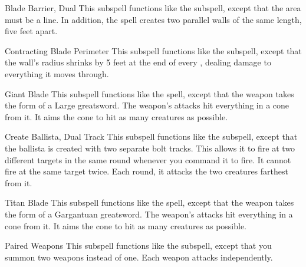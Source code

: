 \begin{ability}[\nth{3}]{Blade Barrier, Dual}
This subspell functions like the  subspell, except that the area must be a line.
In addition, the spell creates two parallel walls of the same length, five feet apart.
\end{ability}
\vspace{0.25em}


\begin{ability}[\nth{3}]{Contracting Blade Perimeter}
This subspell functions like the  subspell, except that the wall's radius shrinks by 5 feet at the end of every , dealing damage to everything it moves through.
\end{ability}
\vspace{0.25em}


\begin{ability}[\nth{3}]{Giant Blade}
This subspell functions like the  spell, except that the weapon takes the form of a Large greatsword.
The weapon's attacks hit everything in a \areasmall cone from it.
It aims the cone to hit as many creatures as possible.
\end{ability}
\vspace{0.25em}


\begin{ability}[\nth{4}]{Create Ballista, Dual Track}
This subspell functions like the  subspell, except that the ballista is created with two separate bolt tracks.
This allows it to fire at two different targets in the same round whenever you command it to fire.
It cannot fire at the same target twice.
Each round, it attacks the two creatures farthest from it.
\end{ability}
\vspace{0.25em}


\begin{ability}[\nth{6}]{Titan Blade}
This subspell functions like the  spell, except that the weapon takes the form of a Gargantuan greatsword.
The weapon's attacks hit everything in a \areamed cone from it.
It aims the cone to hit as many creatures as possible.
\end{ability}
\vspace{0.25em}


\begin{ability}[\nth{7}]{Paired Weapons}
This subspell functions like the  subspell, except that you summon two weapons instead of one.
Each weapon attacks independently.
\end{ability}
\vspace{0.25em}
